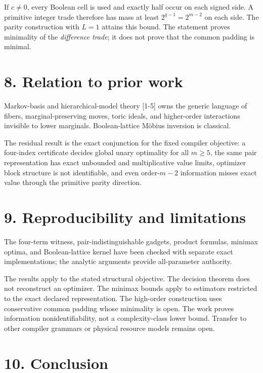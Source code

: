 \documentclass[
  11pt,
]{article}
\begin{document}
If \(c\ne0\), every Boolean cell is used and exactly half occur on each
signed side. A primitive integer trade therefore has mass at least
\(2^{q-1}=2^{m-2}\) on each side. The parity construction with \(L=1\)
attains this bound. The statement proves minimality of the
\emph{difference trade}; it does not prove that the common padding is
minimal.

\hypertarget{relation-to-prior-work}{%
\section{8. Relation to prior work}\label{relation-to-prior-work}}

Markov-basis and hierarchical-model theory {[}1-5{]} owns the generic
language of fibers, marginal-preserving moves, toric ideals, and
higher-order interactions invisible to lower marginals. Boolean-lattice
Möbius inversion is classical.

The residual result is the exact conjunction for the fixed compiler
objective: a four-index certificate decides global unary optimality for
all \(m\ge5\), the same pair representation has exact unbounded and
multiplicative value limits, optimizer block structure is not
identifiable, and even order-\(m-2\) information misses exact value
through the primitive parity direction.

\hypertarget{reproducibility-and-limitations}{%
\section{9. Reproducibility and
limitations}\label{reproducibility-and-limitations}}

The four-term witness, pair-indistinguishable gadgets, product formulas,
minimax optima, and Boolean-lattice kernel have been checked with
separate exact implementations; the analytic arguments provide
all-parameter authority.

The results apply to the stated structural objective. The decision
theorem does not reconstruct an optimizer. The minimax bounds apply to
estimators restricted to the exact declared representation. The
high-order construction uses conservative common padding whose
minimality is open. The work proves information nonidentifiability, not
a complexity-class lower bound. Transfer to other compiler grammars or
physical resource models remains open.

\hypertarget{conclusion}{%
\section{10. Conclusion}\label{conclusion}}
\end{document}
